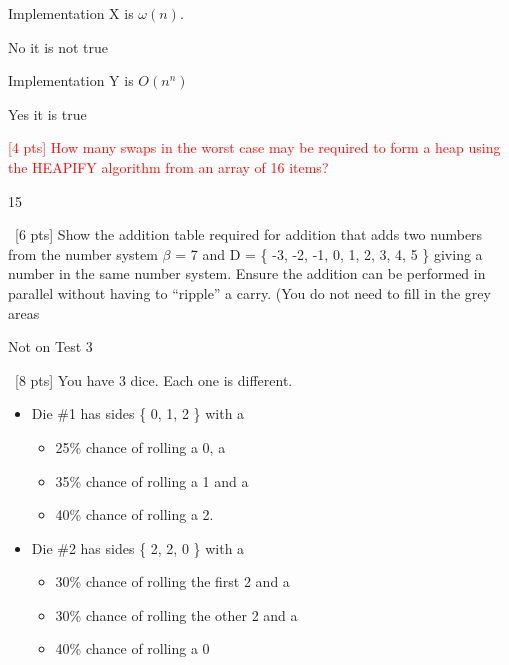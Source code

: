 \documentclass[12pt]{article}
\newenvironment{sol}[1][Solution]{\begin{trivlist}\item[\hskip\labelsep {\bfseries #1:}]}{\end{trivlist}}
\begin{document}
\begin{enumerate}
\begin{enumerate}
        \item Implementation X is $\omega (n)$.
        \begin{sol}
            No it is not true
        \end{sol}
        \item Implementation Y is $O(n^n)$
        \begin{sol}
            Yes it is true
        \end{sol}
    \end{enumerate}
    \item \textcolor{red}{ [4 pts] How many swaps in the worst case may be required to form a heap using the HEAPIFY algorithm from an array of 16 items?}
    \begin{sol}
        15
    \end{sol}

    \item \ [6 pts] Show the addition table required for addition that adds two numbers from the number system $\beta$ = 7 and D = \{ -3, -2, -1, 0, 1, 2, 3, 4, 5 \} giving a number in the same number system. Ensure the addition can be performed in parallel without having to “ripple” a carry. (You do not need to fill in the grey areas

    \begin{sol}
        Not on Test 3
    \end{sol}

    \item \ [8 pts] You have 3 dice. Each one is different.
    \begin{itemize}
        \item Die \#1 has sides \{ 0, 1, 2 \} with a
        \begin{itemize}
            \item 25\% chance of rolling a 0, a
            \item 35\% chance of rolling a 1 and a
            \item 40\% chance of rolling a 2.
        \end{itemize}
        \item Die \#2 has sides \{ 2, 2, 0 \} with a
        \begin{itemize}
            \item 30\% chance of rolling the first 2 and a
            \item 30\% chance of rolling the other 2 and a
            \item 40\% chance of rolling a 0
        \end{itemize}


\end{itemize}
\end{enumerate}
\end{document}
